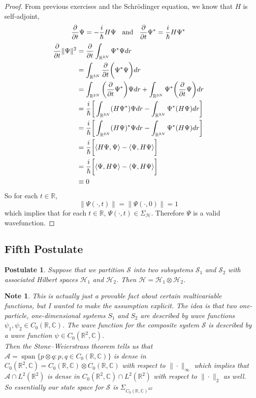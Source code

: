 \documentclass[12pt]{amsart}
\newtheorem{pos}{Postulate}
\newtheorem{note}[thm]{Note}
\renewcommand{\r}{\rangle}
\renewcommand{\l}{\langle}
\newcommand{\sch}{Schr\"{o}dinger }
\newcommand{\Sig}{\Sigma}
\newcommand{\C}{\mathbb{C}}
\newcommand{\R}{\mathbb{R}}
\newcommand{\MA}{\mathcal{A}}
\newcommand{\MS}{\mathcal{S}}
\newcommand{\MH}{\mathcal{H}}
\DeclareMathOperator{\spn}{span}
\begin{document}
	\begin{proof}
		From previous exercises and the \sch equation, we know that $H$ is self-adjoint, $$\pdv{t} \Psi = -\frac{i}{\hbar} H\Psi \hspace{.2cm} \text{ and } \hspace{.2cm} \pdv{t} \Psi^* = \frac{i}{\hbar} H\Psi^*$$  
		\begin{align*}
			\pdv{t}\|\Psi\|^2
			&= \pdv{t} \int_{\R^{3N}} \Psi^* \Psi dr \\
			&= \int_{\R^{3N}} \pdv{t} \bigg(\Psi^* \Psi \bigg) dr \\
			&= \int_{\R^{3N}} \bigg(\pdv{t} \Psi^* \bigg) \Psi dr + \int_{\R^{3N}} \Psi^*\bigg( \pdv{t} \Psi \bigg) dr \\
			&= \frac{i}{\hbar} \bigg[ \int_{\R^{3N}} (H \Psi^*)  \Psi dr - \int_{\R^{3N}} \Psi^* (H \Psi)  dr \bigg] \\
			&= \frac{i}{\hbar} \bigg[ \int_{\R^{3N}} (H \Psi)^*  \Psi dr - \int_{\R^{3N}} \Psi^* (H \Psi)  dr \bigg]\\
			&= \frac{i}{\hbar} \bigg[ \l H \Psi , \Psi\r - \l \Psi , H \Psi\r \bigg]\\
			&= \frac{i}{\hbar} \bigg[ \l \Psi , H\Psi\r - \l \Psi , H \Psi\r \bigg] \\
			&\equiv 0
		\end{align*}
		So for each $t \in \R$, $$\| \Psi(\cdot, t) \| = \| \Psi(\cdot, 0) \| = 1$$
		which implies that  for each $t \in \R$, $\Psi(\cdot, t) \in \Sig_{\MH}$. Therefore $\Psi$ is a valid wavefunction.
	\end{proof}

	\subsection{Fifth Postulate}
	\begin{pos}
		Suppose that we partition $\MS$ into two subsystems $\MS_1$ and $\MS_2$ with associated Hilbert spaces $\MH_1$ and $\MH_2$. Then $\MH = \MH_1 \otimes \MH_2$. 
	\end{pos}

	\begin{note}
		This is actually just a provable fact about certain multivariable functions, but I wanted to make the assumption explicit. The idea is that two one-particle, one-dimensional systems $S_1$ and $S_2$ are described by wave functions $\psi_1, \psi_2 \in C_0(\R, \C)$. The wave function for the composite system $\MS$ is described by a wave function $\psi  \in C_0(\R^2, \C)$. \\ 
		Then the Stone–Weierstrass theorem tells us that $\MA = \spn \{p \otimes q: p,q \in C_0(\R, \C)\}$ is dense in $C_0(\R^2, \C) = C_0(\R, \C) \otimes C_0(\R, \C)$ with respect to $\|\cdot\|_{\infty}$ which implies that $\MA \cap L^2(\R^2)$ is dense in $C_0(\R^2, \C) \cap L^2(\R^2)$ with respect to $\|\cdot\|_{2}$ as well. So essentially our state space for $\MS$ is $\Sig_{C_0(\R, \C)^{\otimes 2}}$
	\end{note}
	
\end{document}
